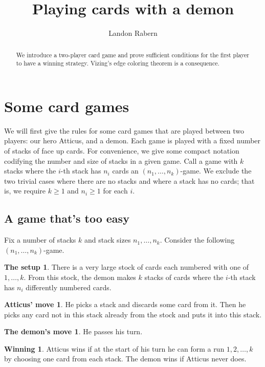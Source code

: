 \documentclass[12pt]{article}
\title{Playing cards with a demon}
\author{Landon Rabern}
\theoremstyle{plain}
\theoremstyle{definition}
\newtheorem*{setup}{The setup}
\newtheorem*{atticus}{Atticus' move}
\newtheorem*{demon}{The demon's move}
\newtheorem*{winning}{Winning}
\theoremstyle{remark}
\begin{document}
\maketitle
\begin{abstract}
We introduce a two-player card game and prove sufficient conditions for the first player to have a winning strategy.  Vizing's edge coloring theorem is a consequence.
\end{abstract}

\section{Some card games}
We will first give the rules for some card games that are played between two players: our hero Atticus, and a demon.  Each game is played with a fixed number of stacks of face up cards.  For convenience, we give some compact notation codifying the number and size of stacks in a given game.  Call a game with $k$ stacks where the $i$-th stack has $n_i$ cards an $(n_1, \ldots, n_k)$-game.  We exclude the two trivial cases where there are no stacks and where a stack has no cards; that is, we require $k \geq 1$ and $n_i \geq 1$ for each $i$. 

\subsection{A game that's too easy}
Fix a number of stacks $k$ and stack sizes $n_1, \ldots, n_k$.  Consider the following $(n_1, \ldots, n_k)$-game.

\begin{setup}
There is a very large stock of cards each numbered with one of $1, \ldots, k$.  From this stock, the demon makes $k$ stacks of cards where the $i$-th stack has $n_i$ differently numbered cards.
\end{setup}

\begin{atticus}
He picks a stack and discards some card from it.  Then he picks any card not in this stack already from the stock and puts it into this stack.
\end{atticus}

\begin{demon}
He passes his turn.
\end{demon}

\begin{winning}
Atticus wins if at the start of his turn he can form a run $1, 2, \ldots, k$ by choosing one card from each stack.  The demon wins if Atticus never does.
\end{winning}
\end{document}
